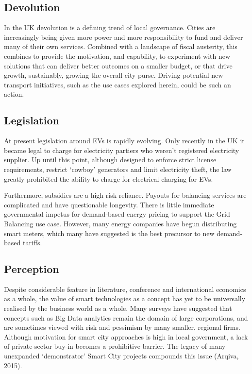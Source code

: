 \documentclass[journal]{IEEEtran}
\begin{document}
\subsection{Devolution}

In the UK devolution is a defining trend of local governance. Cities
are increasingly being given more power and more responsibility to
fund and deliver many of their own services. Combined with a landscape
of fiscal austerity, this combines to provide the motivation, and
capability, to experiment with new solutions that can deliver better
outcomes on a smaller budget, or that drive growth, sustainably,
growing the overall city purse. Driving potential new transport
initiatives, such as the use cases explored herein, could be such an
action.

\subsection{Legislation}

At present legislation around EVs is rapidly evolving. Only recently
in the UK it became legal to charge for electricity partiers who
weren’t registered electricity supplier. Up until this point, although
designed to enforce strict license requirements, restrict `cowboy'
generators and limit electricity theft, the law greatly prohibited the
ability to charge for electrical charging for EVs. 

Furthermore, subsidies are a high risk reliance. Payouts for balancing
services are complicated and have questionable longevity.  There is
little immediate governmental impetus for demand-based energy pricing
to support the Grid Balancing use case. However, many energy companies
have begun distributing smart meters, which many have suggested is the
best precursor to new demand-based tariffs.

\subsection{Perception}

Despite considerable feature in literature, conference and
international economics as a whole, the value of smart technologies as
a concept has yet to be universally realised by the business world as
a whole. Many surveys have suggested that concepts such as Big Data
analytics remain the domain of large corporations, and are sometimes
viewed with risk and pessimism by many smaller, regional
firms. Although motivation for smart city approaches is high in local
government, a lack of private-sector buy-in becomes a prohibitive
barrier.  The legacy of many unexpanded `demonstrator' Smart City
projects compounds this issue (Arqiva, 2015).
\end{document}
